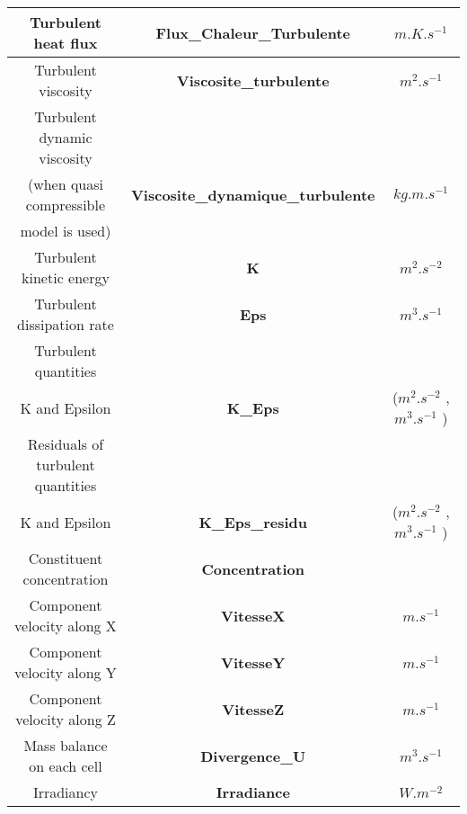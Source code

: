 \begin{longtable}[hcr]{|c|c|c|}
Turbulent heat flux                             & \textbf{Flux\_Chaleur\_Turbulente}        & $m.K.s^{-1}$ \\ \hline
Turbulent viscosity                             & \textbf{Viscosite\_turbulente}            & $m^2.s^{-1}$ \\ \hline
Turbulent dynamic viscosity                     &                                           & \\
(when quasi compressible                        & \textbf{Viscosite\_dynamique\_turbulente} & $kg.m.s^{-1}$ \\
 model is used)                                 &                                           & \\ \hline
Turbulent kinetic energy                        & \textbf{K}                                & $m^2.s^{-2}$ \\ \hline
Turbulent dissipation rate                      & \textbf{Eps}                              & $m^3.s^{-1}$ \\ \hline
Turbulent quantities                            &                                           & \\
K and Epsilon                                   & \textbf{K\_Eps}                           & ($m^2.s^{-2}$ ,$m^3.s^{-1}$ ) \\ \hline
Residuals of turbulent quantities               &                                           & \\
K and Epsilon                                   & \textbf{K\_Eps\_residu}                   & ($m^2.s^{-2}$ ,$m^3.s^{-1}$ ) \\ \hline
Constituent concentration                       & \textbf{Concentration}                    & \\ \hline
Component velocity along X                      & \textbf{VitesseX}                         & $m.s^{-1}$ \\ \hline
Component velocity along Y                      & \textbf{VitesseY}                         & $m.s^{-1}$ \\ \hline
Component velocity along Z                      & \textbf{VitesseZ}                         & $m.s^{-1}$ \\ \hline
Mass balance on each cell                       & \textbf{Divergence\_U}                    & $m^3.s^{-1}$  \\ \hline
Irradiancy                                      & \textbf{Irradiance}                       & $W.m^{-2}$ \\ \hline

\end{longtable}
